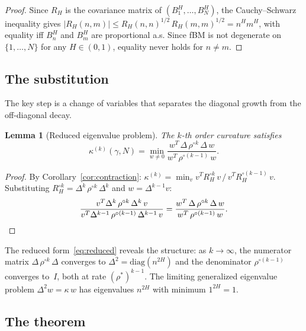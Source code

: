 \documentclass[11pt,a4paper]{article}
\theoremstyle{plain}
\newtheorem{lemma}[theorem]{Lemma}
\theoremstyle{definition}
\theoremstyle{remark}
\begin{document}
\begin{proof}
Since $R_H$ is the covariance matrix of
$(B_1^H, \ldots, B_N^H)$, the Cauchy--Schwarz inequality
gives $|R_H(n,m)| \leq R_H(n,n)^{1/2}\,R_H(m,m)^{1/2}
= n^H m^H$, with equality iff $B_n^H$ and $B_m^H$
are proportional a.s.  Since fBM is not degenerate
on $\{1,\ldots,N\}$ for any $H \in (0,1)$,
equality never holds for $n \neq m$.
\end{proof}


\subsection{The substitution}

The key step is a change of variables that separates the
diagonal growth from the off-diagonal decay.

\begin{lemma}[Reduced eigenvalue problem]
\label{lem:substitution}
The $k$-th order curvature satisfies
\begin{equation}\label{eq:reduced}
  \kappa^{(k)}(\gamma,N)
  = \min_{w \neq 0}
    \frac{w^T\,\Delta\,\rho^{\circ k}\,\Delta\,w}
         {w^T\,\rho^{\circ(k-1)}\,w}.
\end{equation}
\end{lemma}

\begin{proof}
By Corollary~\ref{cor:contraction}:
$\kappa^{(k)} = \min_v
v^T R_H^{\circ k}\,v\,/\,v^T R_H^{\circ(k-1)}\,v$.
Substituting $R_H^{\circ k} = \Delta^k\,\rho^{\circ k}\,\Delta^k$
and $w = \Delta^{k-1} v$:
\[
  \frac{v^T \Delta^k\,\rho^{\circ k}\,\Delta^k\,v}
       {v^T \Delta^{k-1}\,\rho^{\circ(k-1)}\,\Delta^{k-1}\,v}
  = \frac{w^T\,\Delta\,\rho^{\circ k}\,\Delta\,w}
         {w^T\,\rho^{\circ(k-1)}\,w}.
  \qedhere
\]
\end{proof}

The reduced form~\eqref{eq:reduced} reveals the structure:
as $k \to \infty$, the numerator matrix
$\Delta\,\rho^{\circ k}\,\Delta$ converges to
$\Delta^2 = \mathrm{diag}(n^{2H})$ and the denominator
$\rho^{\circ(k-1)}$ converges to~$I$, both at rate
$(\rho^*)^{k-1}$.  The limiting generalized eigenvalue
problem $\Delta^2 w = \kappa\,w$ has eigenvalues
$n^{2H}$ with minimum $1^{2H} = 1$.


\subsection{The theorem}
\end{document}
